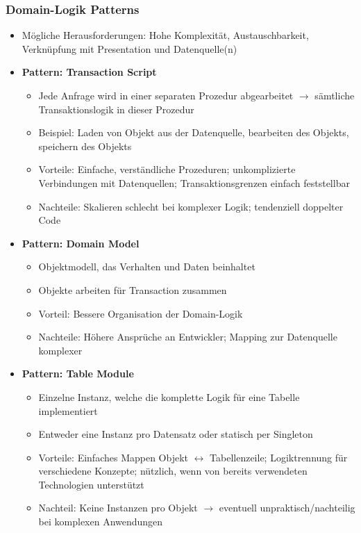\subsubsection{Domain-Logik Patterns}
\begin{itemize}
	\item Mögliche Herausforderungen: Hohe Komplexität, Austauschbarkeit, Verknüpfung mit Presentation und Datenquelle(n)
	\item \textbf{Pattern: Transaction Script}
	\begin{itemize}
		\item Jede Anfrage wird in einer separaten Prozedur abgearbeitet \(\rightarrow\) sämtliche Transaktionslogik in dieser Prozedur
		\item Beispiel: Laden von Objekt aus der Datenquelle, bearbeiten des Objekts, speichern des Objekts
		\item Vorteile: Einfache, verständliche Prozeduren; unkomplizierte Verbindungen mit Datenquellen; Transaktionsgrenzen einfach feststellbar
		\item Nachteile: Skalieren schlecht bei komplexer Logik; tendenziell doppelter Code
	\end{itemize}
	\item \textbf{Pattern: Domain Model}
	\begin{itemize}
		\item Objektmodell, das Verhalten und Daten beinhaltet
		\item Objekte arbeiten für Transaction zusammen
		\item Vorteil: Bessere Organisation der Domain-Logik
		\item Nachteile: Höhere Ansprüche an Entwickler; Mapping zur Datenquelle komplexer
	\end{itemize}
	\item \textbf{Pattern: Table Module}
	\begin{itemize}
		\item Einzelne Instanz, welche die komplette Logik für eine Tabelle implementiert
		\item Entweder eine Instanz pro Datensatz oder statisch per Singleton
		\item Vorteile: Einfaches Mappen Objekt \(\leftrightarrow\) Tabellenzeile; Logiktrennung für verschiedene Konzepte; nützlich, wenn von bereits verwendeten Technologien unterstützt
		\item Nachteil: Keine Instanzen pro Objekt \(\rightarrow\) eventuell unpraktisch/nachteilig bei komplexen Anwendungen
	\end{itemize}

\end{itemize}
